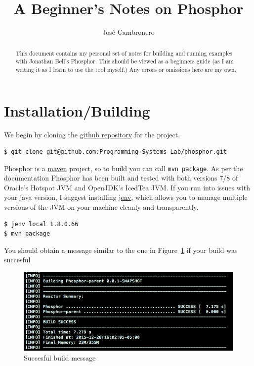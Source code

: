 \documentclass[a4paper]{article}
\title{A Beginner's Notes on Phosphor}
\author{Jos\'e Cambronero}
\begin{document}
\maketitle
\begin{abstract}
This document contains my personal set of notes for building and running examples with Jonathan Bell's
Phosphor\cite{bell2014phosphor}. This should be viewed as a beginners guide (as I am writing it
as I learn to use the tool myself.) Any errors or omissions here are my own.
\end{abstract}

\section{Installation/Building}
\label{install}
We begin by cloning the \href{https://github.com/Programming-Systems-Lab/phosphor}{github repository}
for the project.

\begin{lstlisting}
$ git clone git@github.com:Programming-Systems-Lab/phosphor.git
\end{lstlisting}

Phosphor is a \href{https://maven.apache.org/}{maven} project, so to build you can call
\verb|mvn package|. As per the documentation
Phosphor has been built and tested with both versions 7/8 of Oracle's Hotspot JVM and
OpenJDK's IcedTea JVM. If you run into issues with your java version, I suggest installing
\href{http://www.jenv.be/}{jenv}, which allows you to manage multiple versions of the JVM on your
machine cleanly and transparently.

\begin{lstlisting}
$ jenv local 1.8.0.66
$ mvn package
\end{lstlisting}

You should obtain a message similar to the one in Figure~\ref{fig:phosphor-build} if your build was succesful

\begin{figure}
\includegraphics[width=\textwidth]{figures/phosphor-build}
\caption{Succesful build message}
\label{fig:phosphor-build}
\end{figure}
\end{document}
